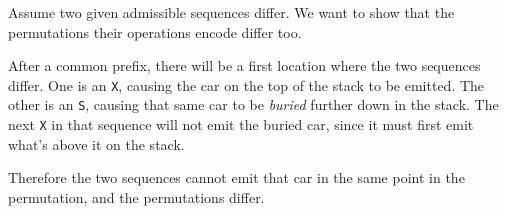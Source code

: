\documentclass{article}
\begin{document}
Assume two given admissible sequences differ. We want to show that the permutations their operations encode differ too.

After a common prefix, there will be a first location where the two sequences differ.
One is an \texttt{X}, causing the car on the top of the stack to be emitted.
The other is an \texttt{S}, causing that same car to be \textit{buried} further down in the stack. The next \texttt{X} in that sequence will not emit the buried car, since it must first emit what's above it on the stack.

Therefore the two sequences cannot emit that car in the same point in the permutation, and the permutations differ.
\end{document}
